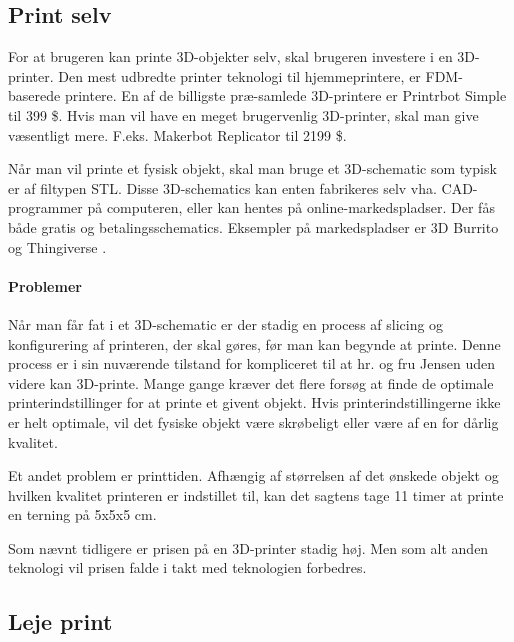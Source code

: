 \subsection{Print selv} %
\label{sub:print_selv}


For at brugeren kan printe 3D-objekter selv, skal brugeren investere i en 3D-printer. Den mest udbredte printer teknologi til hjemmeprintere, er FDM-baserede printere. En af de billigste præ-samlede 3D-printere er Printrbot Simple til 399 \$. \autocite{_assembled_????} Hvis man vil have en meget brugervenlig 3D-printer, skal man give væsentligt mere. F.eks. Makerbot Replicator til 2199 \$. \autocite{_makerbot_????}

Når man vil printe et fysisk objekt, skal man bruge et 3D-schematic som typisk er af filtypen STL. Disse 3D-schematics kan enten fabrikeres selv vha. CAD-programmer på computeren, eller kan hentes på online-markedspladser. Der fås både gratis og betalingsschematics. Eksempler på markedspladser er 3D Burrito \autocite{_3d_2013-1} og Thingiverse \autocite{_thingiverse_????}.


\paragraph{Problemer} %
\label{par:problemer_mangler}

Når man får fat i et 3D-schematic er der stadig en process af slicing og konfigurering af printeren, der skal gøres, før man kan begynde at printe. Denne process er i sin nuværende tilstand for kompliceret til at hr. og fru Jensen uden videre kan 3D-printe. Mange gange kræver det flere forsøg at finde de optimale printerindstillinger for at printe et givent objekt. Hvis printerindstillingerne ikke er helt optimale, vil det fysiske objekt være skrøbeligt eller være af en for dårlig kvalitet. \autocite{_3d_2013}

Et andet problem er printtiden. Afhængig af størrelsen af det ønskede objekt og hvilken kvalitet printeren er indstillet til, kan det sagtens tage 11 timer at printe en terning på 5x5x5 cm. \autocite{_3d_2013}

Som nævnt tidligere er prisen på en 3D-printer stadig høj. Men som alt anden teknologi vil prisen falde i takt med teknologien forbedres.





\subsection{Leje print} %
\label{sub:leje_print}


